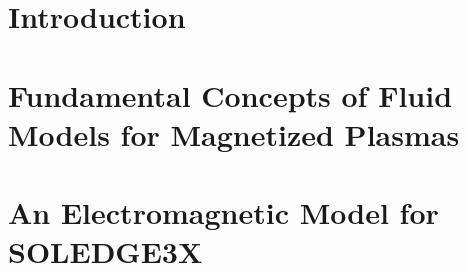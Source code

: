 \documentclass[english]{amu_these}
\begin{document}
	
										





	\tableofcontents					%
	\listoffigures						%
	\listoftables						%
	\printglossary[						%
		type=\acronymtype,
		title={List of acronymes},
		toctitle={List of acronymes}
		]
	\printglossary[						%
		title={Glossary},
		toctitle={Glossary}
		]
	\printglossary[						%
		type=notation,
		title={Naming convention},
		toctitle={Naming convention}
		]

	\ohead{\leftmark\Ifstr{\rightmark}{\leftmark}{}{ -- \rightmark}}	%
	
	\part[Introduction]{Introduction}
	\label{part:Introduction}	
	
	
	\part[Fundamental Concepts of Fluid Models for Magnetized Plasmas]{Fundamental Concepts of Fluid Models for Magnetized Plasmas}
	\label{part:FundamentalsPlasmaSimulations}
	
	
	

	\part[An Electromagnetic Model for SOLEDGE3X]{An Electromagnetic Model for SOLEDGE3X}
	\label{part:ElectromagneticModel}
	
	
	
	
\end{document}
